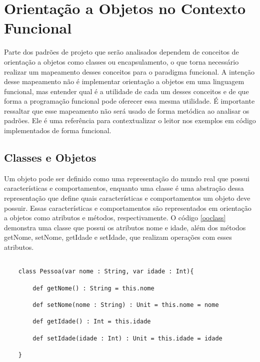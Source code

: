 
\chapter{Orientação a Objetos no Contexto Funcional}


Parte dos padrões de projeto que serão 
analisados dependem de conceitos 
de orientação a objetos como classes ou 
encapsulamento, o que torna necessário 
realizar um mapeamento desses conceitos 
para o paradigma funcional. A intenção 
desse mapeamento não é implementar 
orientação a objetos em uma linguagem 
funcional, mas entender qual é a utilidade 
de cada um desses conceitos e de que 
forma a programação funcional pode 
oferecer essa mesma utilidade. É importante 
ressaltar que esse mapeamento não será usado 
de forma metódica ao analisar os padrões. 
Ele é uma referência para contextualizar 
o leitor nos exemplos em código 
implementados de forma funcional. 


\section{Classes e Objetos}

Um objeto pode ser definido como uma representação 
do mundo real que possui características e comportamentos, 
enquanto uma classe é uma abstração dessa representação 
que define quais características e comportamentos um objeto 
deve possuir\cite{umlsystems}. Essas características 
e comportamentos são representados em orientação a 
objetos como atributos e métodos, respectivamente. 
O código \ref{ooclass} demonstra uma classe que 
possui os atributos nome e idade, além dos métodos 
getNome, setNome, getIdade e setIdade, que realizam 
operações com esses atributos.

\begin{lstlisting}[caption={Classe comum em Orientação a Objetos},label=ooclass]
    
    class Pessoa(var nome : String, var idade : Int){

        def getNome() : String = this.nome

        def setNome(nome : String) : Unit = this.nome = nome

        def getIdade() : Int = this.idade

        def setIdade(idade : Int) : Unit = this.idade = idade

    }   

\end{lstlisting}

